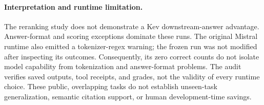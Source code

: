\paragraph{Interpretation and runtime limitation.}
The reranking study does not demonstrate a Kev downstream-answer advantage.
Answer-format and scoring exceptions dominate these runs. The original Mistral
runtime also emitted a tokenizer-regex warning; the frozen run was not modified
after inspecting its outcomes. Consequently, its zero correct counts do not
isolate model capability from tokenization and answer-format problems. The
audit verifies saved outputs, tool receipts, and grades, not the validity of
every runtime choice. These public, overlapping tasks do not establish
unseen-task generalization, semantic citation support, or human development-time
savings.
